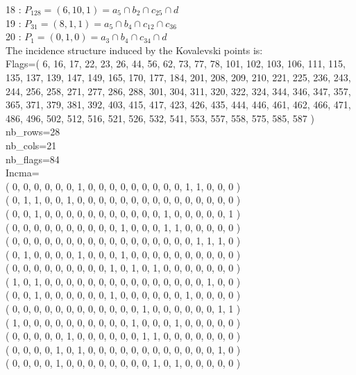 \documentclass{article}
\begin{document}
{18 : $P_{128}=( 6, 10, 1 ) = a_{5} \cap b_{2} \cap c_{25} \cap d$\\
19 : $P_{31}=( 8, 1, 1 ) = a_{5} \cap b_{4} \cap c_{12} \cap c_{36}$\\
20 : $P_{1}=( 0, 1, 0 ) = a_{3} \cap b_{4} \cap c_{34} \cap d$\\
The incidence structure induced by the Kovalevski points is: 
\\
Flags=( 6, 16, 17, 22, 23, 26, 44, 56, 62, 73, 77, 78, 101, 102, 103, 106, 111, 115, 135, 137, 139, 147, 149, 165, 170, 177, 184, 201, 208, 209, 210, 221, 225, 236, 243, 244, 256, 258, 271, 277, 286, 288, 301, 304, 311, 320, 322, 324, 344, 346, 347, 357, 365, 371, 379, 381, 392, 403, 415, 417, 423, 426, 435, 444, 446, 461, 462, 466, 471, 486, 496, 502, 512, 516, 521, 526, 532, 541, 553, 557, 558, 575, 585, 587 )\\
nb\_rows=28\\
nb\_cols=21\\
nb\_flags=84\\
Incma=\\
( 0, 0, 0, 0, 0, 0, 1, 0, 0, 0, 0, 0, 0, 0, 0, 0, 1, 1, 0, 0, 0 )\\
( 0, 1, 1, 0, 0, 1, 0, 0, 0, 0, 0, 0, 0, 0, 0, 0, 0, 0, 0, 0, 0 )\\
( 0, 0, 1, 0, 0, 0, 0, 0, 0, 0, 0, 0, 0, 0, 1, 0, 0, 0, 0, 0, 1 )\\
( 0, 0, 0, 0, 0, 0, 0, 0, 0, 0, 1, 0, 0, 0, 1, 1, 0, 0, 0, 0, 0 )\\
( 0, 0, 0, 0, 0, 0, 0, 0, 0, 0, 0, 0, 0, 0, 0, 0, 0, 1, 1, 1, 0 )\\
( 0, 1, 0, 0, 0, 0, 1, 0, 0, 0, 1, 0, 0, 0, 0, 0, 0, 0, 0, 0, 0 )\\
( 0, 0, 0, 0, 0, 0, 0, 0, 0, 1, 0, 1, 0, 1, 0, 0, 0, 0, 0, 0, 0 )\\
( 1, 0, 1, 0, 0, 0, 0, 0, 0, 0, 0, 0, 0, 0, 0, 0, 0, 0, 1, 0, 0 )\\
( 0, 0, 1, 0, 0, 0, 0, 0, 0, 1, 0, 0, 0, 0, 0, 0, 1, 0, 0, 0, 0 )\\
( 0, 0, 0, 0, 0, 0, 0, 0, 0, 0, 0, 0, 1, 0, 0, 0, 0, 0, 0, 1, 1 )\\
( 1, 0, 0, 0, 0, 0, 0, 0, 0, 0, 0, 1, 0, 0, 0, 1, 0, 0, 0, 0, 0 )\\
( 0, 0, 0, 0, 0, 1, 0, 0, 0, 0, 0, 0, 1, 1, 0, 0, 0, 0, 0, 0, 0 )\\
( 0, 0, 0, 0, 1, 0, 1, 0, 0, 0, 0, 0, 0, 0, 0, 0, 0, 0, 0, 1, 0 )\\
( 0, 0, 0, 0, 1, 0, 0, 0, 0, 0, 0, 0, 0, 1, 0, 1, 0, 0, 0, 0, 0 )\\
}
\end{document}
